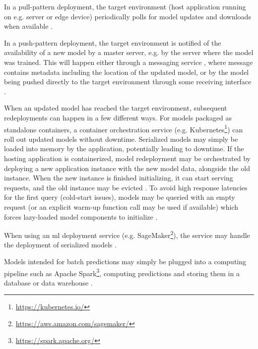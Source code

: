 In a pull-pattern deployment, the target environment (host application running on e.g. server or edge device) periodically polls for model updates and downloads when available \cite{Paeaekkoenen2020, Li2017, Peticolas2019}.

In a push-pattern deployment, the target environment is notified of the availability of a new model by a master server, e.g. by the server where the model was trained.
This will happen either through a messaging service \cite{Liu2020, Garcia2020}, where message contains metadata including the location of the updated model, or by the model being pushed directly to the target environment through some receiving interface \cite{Paeaekkoenen2020}.

When an updated model has reached the target environment, subsequent redeployments can happen in a few different ways.
For models packaged as standalone containers, a container orchestration service (e.g. Kubernetes\footnote{\url{https://kubernetes.io/}}) can roll out updated models without downtime.
Serialized models may simply be loaded into memory by the application, potentially leading to downtime.
If the hosting application is containerized, model redeployment may be orchestrated by deploying a new application instance with the new model data, alongside the old instance.
When the new instance is finished initializing, it can start serving requests, and the old instance may be evicted \cite{Paeaekkoenen2020}.
To avoid high response latencies for the first query (cold-start issues), models may be queried with an empty request (or an explicit warm-up function call may be used if available) which forces lazy-loaded model components to initialize \cite{Li2017}.

When using an \acrshort{ml} deployment service (e.g. SageMaker\footnote{\url{https://aws.amazon.com/sagemaker/}}), the service may handle the deployment of serialized models \cite{Chahal2020}.

Models intended for batch predictions may simply be plugged into a computing pipeline such as Apache Spark\footnote{\url{https://spark.apache.org/}}, computing predictions and storing them in a database or data warehouse \cite{Li2017}.

